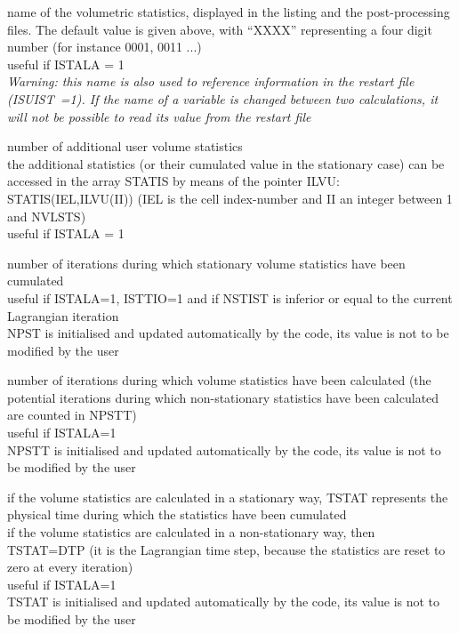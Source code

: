 {name of the volumetric statistics, displayed in the listing
and the post-processing files. The default value is given above, with ``XXXX''
representing a four digit number (for instance 0001, 0011 ...)\\
useful if ISTALA = 1\\
{\em Warning: this name is also used to reference information in the restart file
\mbox{(ISUIST =1)}. If the name of a variable is changed between two
calculations, it will not be possible to read its value from the restart file}}

{number of additional user volume statistics\\
the additional statistics (or their cumulated value in the stationary
case) can be accessed in the array STATIS by means of the pointer
ILVU: STATIS(IEL,ILVU(II)) (IEL is the cell
index-number and II an integer between 1 and NVLSTS)\\
useful if ISTALA = 1}

{number of iterations during which stationary volume statistics have
been cumulated\\
useful if ISTALA=1, ISTTIO=1 and if NSTIST is inferior or equal to
the current Lagrangian iteration\\
NPST is initialised and updated automatically by the code, its value is not to
be modified by the user}

{number of iterations during which volume statistics have been
calculated (the potential iterations during which non-stationary
statistics have been calculated are counted in NPSTT)\\
useful if ISTALA=1\\
NPSTT is initialised and updated automatically by the code, its value is not to
be modified by the user}

{if the volume statistics are calculated in a stationary way, TSTAT
represents the physical time during which the statistics have been cumulated\\
if the volume statistics are calculated in a non-stationary way,
then TSTAT=DTP (it is the Lagrangian time step, because the
statistics are reset to zero at every iteration)\\
useful if ISTALA=1\\
TSTAT is initialised and updated automatically by the code, its value is not to
be modified by the user}

